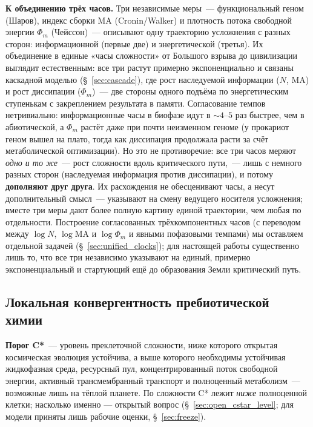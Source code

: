 \documentclass[12pt,a4paper]{article}
\begin{document}
\textbf{К объединению трёх часов.} Три независимые меры~--- функциональный геном (Шаров), индекс сборки MA (Cronin/Walker) и плотность потока свободной энергии $\Phi_m$ (Чейссон)~--- описывают одну траекторию усложнения с разных сторон: информационной (первые две) и энергетической (третья). Их объединение в единые «часы сложности» от Большого взрыва до цивилизации выглядит естественным: все три растут примерно экспоненциально и связаны каскадной моделью (\S~\ref{sec:cascade}), где рост наследуемой информации ($N$, MA) и рост диссипации ($\Phi_m$)~--- две стороны одного подъёма по энергетическим ступенькам с закреплением результата в памяти. Согласование темпов нетривиально: информационные часы в биофазе идут в $\sim 4$--$5$ раз быстрее, чем в абиотической, а $\Phi_m$ растёт даже при почти неизменном геноме (у прокариот геном вышел на плато, тогда как диссипация продолжала расти за счёт метаболической оптимизации). Но это не противоречие: все три часов меряют \emph{одно и то же}~--- рост сложности вдоль критического пути,~--- лишь с немного разных сторон (наследуемая информация против диссипации), и потому \textbf{дополняют друг друга}. Их расхождения не обесценивают часы, а несут дополнительный смысл~--- указывают на смену ведущего носителя усложнения; вместе три меры дают более полную картину единой траектории, чем любая по отдельности. Построение согласованных трёхкомпонентных часов (с переводом между $\log N$, $\log \mathrm{MA}$ и $\log \Phi_m$ и явными пофазовыми темпами) мы оставляем отдельной задачей (\S~\ref{sec:unified_clocks}); для настоящей работы существенно лишь то, что все три независимо указывают на единый, примерно экспоненциальный и стартующий ещё до образования Земли критический путь.

\subsection{Локальная конвергентность пребиотической химии}
\label{sec:local_conv}

\textbf{Порог C*}~--- уровень преклеточной сложности, ниже которого открытая космическая эволюция устойчива, а выше которого необходимы устойчивая жидкофазная среда, ресурсный пул, концентрированный поток свободной энергии, активный трансмембранный транспорт и полноценный метаболизм~--- возможные лишь на тёплой планете. По сложности C* лежит \emph{ниже} полноценной клетки; насколько именно --- открытый вопрос (\S~\ref{sec:open_cstar_level}; для модели приняты лишь рабочие оценки, \S~\ref{sec:freeze}).
\end{document}
